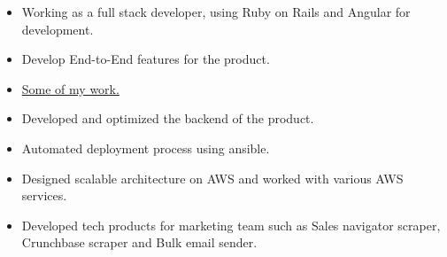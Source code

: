 \documentclass[10pt,a4paper]{main}
\begin{document}
\tagline{}

%

\begin{fullwidth}
\makecvheader
\end{fullwidth}

%





\begin{itemize}
	\item Working as a full stack developer, using Ruby on Rails and Angular for development.
    \item Develop End-to-End features for the product.
    \item {\href{https://codingninjas.com/courses}{Some of my work.}}
\end{itemize}

\divider
%



\begin{itemize}
  \item Developed and optimized the backend of the product.
    \item Automated deployment process using ansible.
    \item Designed scalable architecture on AWS and worked with various AWS services.
    \item Developed tech products for marketing team such as Sales navigator scraper, Crunchbase scraper and Bulk email sender.
\end{itemize}

\divider
%


\end{document}
